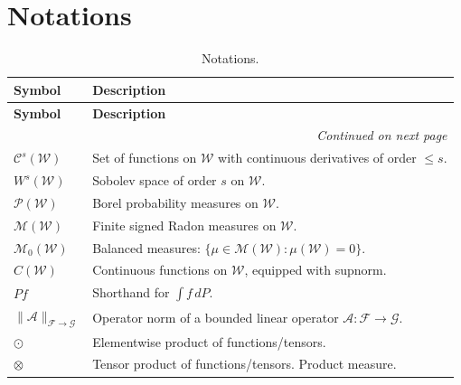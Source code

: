 \documentclass{article}
\theoremstyle{plain}
\theoremstyle{definition}
\theoremstyle{remark}
\newcommand{\cF}{\mathcal{F}}
\newcommand{\cP}{\mathcal{P}}
\newcommand{\cG}{\mathcal{G}}
\newcommand{\cC}{\mathcal{C}}
\newcommand{\cM}{\mathcal{M}}
\newcommand{\cA}{\mathcal{A}}
\newcommand{\ucW}{\mathscr{W}}
\newcommand{\1}{\mathbbm{1}}
\theoremstyle{plain}
\theoremstyle{definition}
\begin{document}
\etocsettocstyle{}{}
\localtableofcontents

\section{Notations} \label{appendix:notaions}

\begin{center}
\begin{small}
\begin{longtable}{@{}ll@{}}
\caption{Notations.}\label{tab:notations}\\
\toprule
\textbf{Symbol} & \textbf{Description}\\
\midrule
\endfirsthead

\toprule
\textbf{Symbol} & \textbf{Description}\\
\midrule
\endhead

\midrule
\multicolumn{2}{r}{\small\emph{Continued on next page}}\\
\midrule
\endfoot

\bottomrule
\endlastfoot
            $\cC^s(\ucW)$ & Set of functions on $\ucW$ with continuous derivatives of order $\leq s$. \\
            $W^{s}(\ucW)$ & Sobolev space of order $s$ on $\ucW$. \\
            $\cP(\ucW)$ & Borel probability measures on $\ucW$. \\
            $\cM(\ucW)$ & Finite signed Radon measures on $\ucW$. \\
            $\cM_0(\ucW)$ & Balanced measures: $\{\mu\in\mathcal M(\ucW):\mu(\ucW)=0\}$. \\
            $C(\ucW)$ & Continuous functions on $\ucW$, equipped with supnorm. \\
            $P f$ & Shorthand for $\int f\,dP$. \\
            $\|\cA\|_{\cF\to \cG}$ &  Operator norm of a bounded linear operator $\cA:\cF\to \cG$. \\
            $\odot$ & Elementwise product of functions/tensors. \\
            $\otimes$ & Tensor product of functions/tensors. Product measure. \\


\end{longtable}
\end{small}
\end{center}
\end{document}
